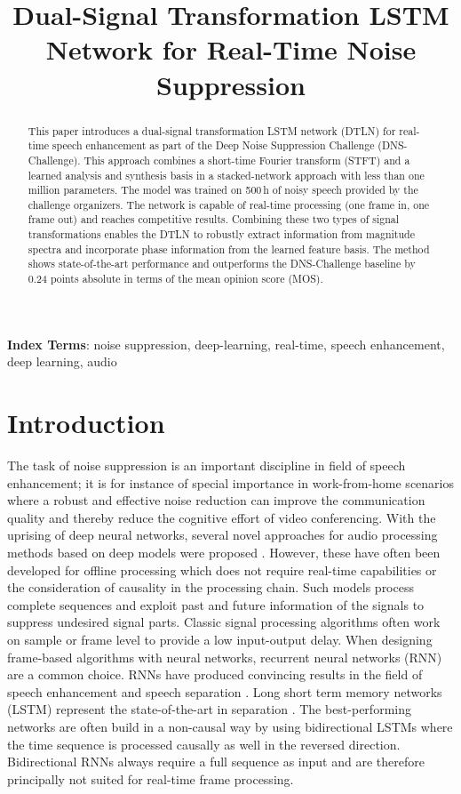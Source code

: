 \documentclass[a4paper]{article}
\title{Dual-Signal Transformation LSTM Network for Real-Time Noise Suppression}
\begin{document}
\maketitle

\begin{abstract}
  This paper introduces a dual-signal transformation LSTM network (DTLN) for real-time speech enhancement as part of the Deep Noise Suppression Challenge (DNS-Challenge). This approach combines a short-time Fourier transform (STFT) and a learned analysis and synthesis basis in a stacked-network approach with less than one million parameters. The model was trained on 500\,h of noisy speech provided by the challenge organizers. The network is capable of real-time processing (one frame in, one frame out) and reaches competitive results.
  Combining these two types of signal transformations enables the DTLN to robustly extract information from magnitude spectra and incorporate phase information from the learned feature basis. The method shows state-of-the-art performance and outperforms the DNS-Challenge baseline by 0.24 points absolute in terms of the mean opinion score (MOS). 
\end{abstract}
\noindent\textbf{Index Terms}: noise suppression, deep-learning, real-time, speech enhancement, deep learning, audio

\section{Introduction}
The task of noise suppression is an important discipline in field of speech enhancement; it is for instance of special importance in work-from-home scenarios where a robust and effective noise reduction can improve the communication quality and thereby reduce the cognitive effort of video conferencing.  
With the uprising of deep neural networks, several novel approaches for audio processing methods based on deep models were proposed \cite{xu2013experimental, han2014learning,pascual2017segan, park2016fully}. 
However, these have often been developed for offline processing which does not require real-time capabilities or the consideration of causality in the processing chain. 
Such models process complete sequences and exploit past and future information of the signals to suppress undesired signal parts. 
Classic signal processing algorithms \cite{ephraim1984speech, griffiths1982alternative} often work on sample or frame level to provide a low input-output delay. 
When designing frame-based algorithms with neural networks, recurrent neural networks (RNN) are a common choice. 
RNNs have produced convincing results in the field of speech enhancement  \cite{valentini2016investigating,valin2018hybrid} and speech separation \cite{isik2016single,kolbaek2017multitalker,luo2018tasnet}. 
Long short term memory networks (LSTM) \cite{hochreiter1997long} represent the state-of-the-art in separation \cite{luo2019dual}. The best-performing networks are often build in a non-causal way by using bidirectional LSTMs where the time sequence is processed causally as well in the reversed direction. 
Bidirectional RNNs always require a full sequence as input and are therefore principally not suited for real-time frame processing. 
\end{document}
